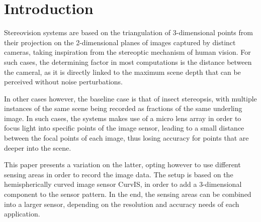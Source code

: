 \section{Introduction}

Stereovision systems are based on the triangulation of 3-dimensional points from their projection
on the 2-dimensional planes of images captured by distinct cameras, taking inspiration from the 
stereoptic mechanism of human vision. For such cases, the determining factor in most computations
is the distance between the cameral, as it is directly linked to the maximum scene depth that can 
be perceived without noise perturbations.~\cite{withGeneralDepth, withMain, withNavigation}

In other cases however, the baseline case is that of insect stereopsis, with multiple instances of the
same scene being recorded as fractions of the same underling image. In such cases, the systems makes
use of a micro lens array in order to focus light into specific points of the image sensor, leading
to a small distance between the focal points of each image, thus losing accuracy for points that are
deeper into the scene.~\cite{withInsects}

This paper presents a variation on the latter, opting however to use different sensing areas in order
to record the image data. The setup is based on the hemispherically curved image sensor CurvIS, in
order to add a 3-dimensional component to the sensor pattern. In the end, the sensing areas can be 
combined into a larger sensor, depending on the resolution and accuracy needs of each application.